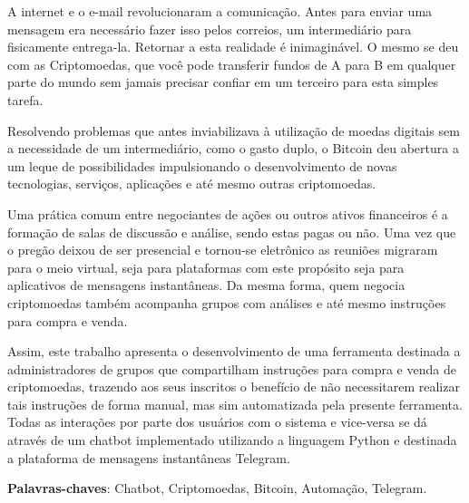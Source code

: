 \begin{resumo}

A internet e o e-mail revolucionaram a comunicação. Antes para enviar uma mensagem era necessário fazer isso pelos correios, um intermediário para fisicamente entrega-la. Retornar a esta realidade é inimaginável. O mesmo se deu com as Criptomoedas, que você pode transferir fundos de A para B em qualquer parte do mundo sem jamais precisar confiar em um terceiro para esta simples tarefa. 

Resolvendo problemas que antes inviabilizava à utilização de moedas digitais sem a necessidade de um intermediário, como o gasto duplo, o Bitcoin deu abertura a um leque de possibilidades impulsionando o desenvolvimento de novas tecnologias, serviços, aplicações e até mesmo outras criptomoedas. 

Uma prática comum entre negociantes de ações ou outros ativos financeiros é a formação de salas de  discussão e análise, sendo estas pagas ou não. Uma vez que o pregão deixou de ser presencial e tornou-se eletrônico as reuniões migraram para o meio virtual, seja para plataformas com este propósito seja para aplicativos de mensagens instantâneas. Da mesma forma, quem negocia criptomoedas também acompanha grupos com análises e até mesmo instruções para compra e venda. 

Assim, este trabalho apresenta o desenvolvimento de uma ferramenta destinada a administradores de grupos que compartilham instruções para compra e venda de criptomoedas, trazendo aos seus inscritos o benefício de não necessitarem realizar tais instruções de forma manual, mas sim automatizada pela presente ferramenta. Todas as interações por parte dos usuários com o sistema e vice-versa se dá através de um chatbot implementado utilizando a linguagem Python e destinada a plataforma de mensagens instantâneas Telegram.

\vspace{\onelineskip}
\noindent
\textbf{Palavras-chaves}: Chatbot, Criptomoedas, Bitcoin, Automação, Telegram.
\end{resumo}